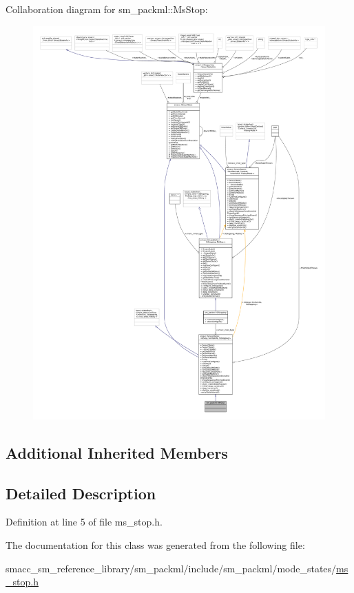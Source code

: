 Collaboration diagram for sm\+\_\+packml\+:\+:Ms\+Stop\+:
\nopagebreak
\begin{figure}[H]
\begin{center}
\leavevmode
\includegraphics[width=350pt]{classsm__packml_1_1MsStop__coll__graph}
\end{center}
\end{figure}
\subsection*{Additional Inherited Members}


\subsection{Detailed Description}


Definition at line 5 of file ms\+\_\+stop.\+h.



The documentation for this class was generated from the following file\+:\begin{DoxyCompactItemize}
\item 
smacc\+\_\+sm\+\_\+reference\+\_\+library/sm\+\_\+packml/include/sm\+\_\+packml/mode\+\_\+states/\hyperlink{ms__stop_8h}{ms\+\_\+stop.\+h}\end{DoxyCompactItemize}
